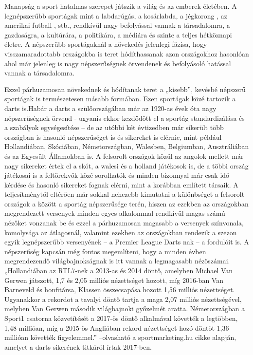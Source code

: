 
Manapság a sport hatalmas szerepet játszik a világ és az emberek életében. A legnépszerűbb 
sportágak mint a labdarúgás, a kosárlabda, a jégkorong , az amerikai futball , stb., rendkívül 
nagy befolyással vannak a társadalomra, a gazdaságra, a kultúrára, a politikára, a médiára és 
szinte a teljes hétköznapi életre. A népszerűbb sportágaknál a növekedés jelenlegi fázisa, 
hogy visszamaradottabb országokba is teret hódíthassanak azon országokhoz hasonlóan ahol 
már jelenleg is nagy népszerűségnek örvendenek és befolyásoló hatással vannak a 
társadalomra.

Ezzel párhuzamosan növekednek és hódítanak teret a „kisebb”, kevésbé népszerű sportágak 
is természetesen másabb formában. Ezen sportágak közé tartozik a darts is.Habár a darts a 
szülőországában már az 1920-as évek óta nagy népszerűségnek örvend - ugyanis ekkor 
kezdődött el a sportág standardizálása és a szabályok egységesítése – de az utóbbi két 
évtizedben már sikerült több országban is hasonló népszerűséget is és sikereket is elérnie, 
mint például Hollandiában, Skóciában, Németországban, Walesben, Belgiumban, 
Ausztráliában és az Egyesült Államokban is. A felsorolt országok közül az angolok mellett 
már nagy sikereket értek el a skót, a walesi és a holland játékosok is, de a többi ország 
játékosai is a feltörekvők közé sorolhatók és minden bizonnyal már csak idő kérdése és 
hasonló sikereket fognak elérni, mint a korábban említett társaik. A teljesítménytől eltérően 
már sokkal nehezebb kimutatni a különbséget a felsorolt országok a között a sportág 
népszerűsége terén, hiszen az ezekben az országokban megrendezett versenyek minden 
egyes alkalommal rendkívül magas számú nézőket vonzanak be és ezzel a párhuzamosan 
magasabb a versenyek színvonala, komolysága az átlagosnál, valamint ezekben az 
országokban rendezik a szezon egyik legnépszerűbb versenyének – a Premier League Darts
nak – a fordulóit is. A népszerűség kapcsán még fontos megemlíteni, hogy a minden évben 
megrendezendő világbajnokságnak is itt vannak a legmagasabb nézőszámai.  
„Hollandiában az RTL7-nek a 2013-as és 2014 döntő, amelyben Michael Van Gerwen 
játszott, 1,7 és 2,05 milliós nézettséget hozott, míg 2016-ban Van Barneveld és honfitársa, 
Klassen összecsapása hozott 1,56 milliós nézettséget. Ugyanakkor a rekordot a tavalyi döntő 
tartja a maga 2,07 milliós nézettségével, melyben Van Gerwen második világbajnoki 
győzelmét aratta. Németországban a Sport1 csatorna közvetítését a 2017-ös döntő 
alkalmával követték a legtöbben, 1,48 millióan, míg a 2015-ös Angliában rekord nézettséget 
hozó döntőt 1,36 millióan követték figyelemmel.” –olvasható a sportmarketing.hu cikke 
alapján, amelyet a darts sikerének titkáról írtak 2017-ben.
\cite{Darts}


